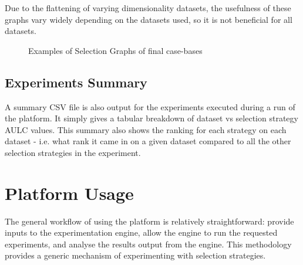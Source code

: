 \documentclass[a4paper,11pt]{report}
\begin{document}
Due to the flattening of varying dimensionality datasets, the usefulness of these graphs vary widely depending on the datasets used, so it is not beneficial for all datasets.


\begin{figure}[ht]
\centering
{}

\label{fig:selectiongraphexample}
\caption{Examples of Selection Graphs of final case-bases}
\end{figure}

\subsection{Experiments Summary}
A summary CSV file is also output for the experiments executed during a run of the platform. It simply gives a tabular breakdown of dataset vs selection strategy AULC values. This summary also shows the ranking for each strategy on each dataset - i.e. what rank it came in on a given dataset compared to all the other selection strategies in the experiment.

\section{Platform Usage}
The general workflow of using the platform is relatively straightforward: provide inputs to the experimentation engine, allow the engine to run the requested experiments, and analyse the results output from the engine. This methodology provides a generic mechanism of experimenting with selection strategies.
\end{document}
